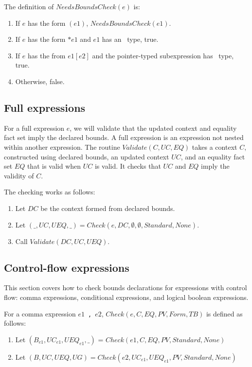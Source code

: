 The definition of $NeedsBoundsCheck(e)$ is:
\begin{enumerate}
\item If $e$ has the form $(e1)$, $NeedsBoundsCheck(e1).$
\item If $e$ has the form $*e1$ and $e1$ has an \arrayptr\ type, true.
\item If $e$ has the from $e1[e2]$ and the pointer-typed subexpression has \arrayptr\ type, true.
\item Otherwise, false.
\end{enumerate}


\subsection{Full expressions}

For a full expression $e$, we will validate that the updated context
and equality fact set imply the declared bounds.
A full expression \cite[Annex C]{ISO2011} is an expression not nested within another expression.
The routine $Validate(C, UC, EQ)$ takes a context $C$,
constructed using declared bounds, an updated context $UC$, and an equality fact set $EQ$
that is valid when $UC$ is valid.  It checks that $UC$ and $EQ$ imply the validity of $C$.

The checking works as follows:
\begin{enumerate}
\item Let $DC$ be the context formed from declared bounds.
\item Let $(\_, UC, UEQ, \_) = Check(e, DC, \emptyset, \emptyset, Standard, None)$.
\item Call $Validate(DC, UC, UEQ)$.
\end{enumerate}

\subsection{Control-flow expressions}

This section covers how to check bounds declarations for expressions
with control flow: comma expressions, conditional expressions, and 
logical boolean expressions.

For a comma expression $e1$~\lstinline|,|~$e2$, $Check(e, C, EQ, PV, Form, TB)$ is defined as follows:
\begin{enumerate}
\item Let $(B_{e1}, {UC}_{e1}, {UEQ}_{e1}, \_)$ = $Check(e1, C, EQ, PV, Standard, None)$
\item Let $(B, UC, UEQ, UG) = Check(e2, {UC}_{e1}, {UEQ}_{e1}, PV, Standard, None)$
\end{enumerate}

